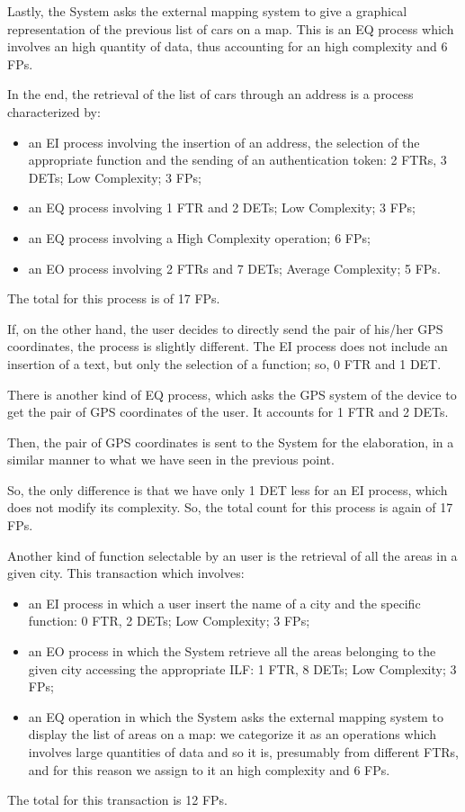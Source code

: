 Lastly, the System asks the external mapping system to give a graphical representation of the previous list of cars on a map. This is an EQ process which involves an high quantity of data, thus accounting for an high complexity and 6 FPs.

In the end, the retrieval of the list of cars through an address is a process characterized by:
\begin{itemize}
	\item an EI process involving the insertion of an address, the selection of the appropriate function and the sending of an authentication token: 2 FTRs, 3 DETs; Low Complexity; 3 FPs;
	\item an EQ process involving 1 FTR and 2 DETs; Low Complexity; 3 FPs;
	\item an EQ process involving a High Complexity operation; 6 FPs;
	\item an EO process involving 2 FTRs and 7 DETs; Average Complexity; 5 FPs.
\end{itemize}
The total for this process is of 17 FPs.
\bigskip

If, on the other hand, the user decides to directly send the pair of his/her GPS coordinates, the process is slightly different.
The EI process does not include an insertion of a text, but only the selection of a function; so, 0 FTR and 1 DET.

There is another kind of EQ process, which asks the GPS system of the device to get the pair of GPS coordinates of the user. It accounts for 1 FTR and 2 DETs.

Then, the pair of GPS coordinates is sent to the System for the elaboration, in a similar manner to what we have seen in the previous point.

So, the only difference is that we have only 1 DET less for an EI process, which does not modify its complexity. So, the total count for this process is again of 17 FPs.
\bigskip

Another kind of function selectable by an user is the retrieval of all the areas in a given city. This transaction which involves:
\begin{itemize}
	\item an EI process in which a user insert the name of a city and the specific function: 0 FTR, 2 DETs; Low Complexity; 3 FPs;
	\item an EO process in which the System retrieve all the areas belonging to the given city accessing the appropriate ILF: 1 FTR, 8 DETs; Low Complexity; 3 FPs;
	\item an EQ operation in which the System asks the external mapping system to display the list of areas on a map: we categorize it as an operations which involves large quantities of data and so it is, presumably from different FTRs, and for this reason we assign to it an high complexity and 6 FPs.
\end{itemize}
The total for this transaction is 12 FPs. 
\bigskip

